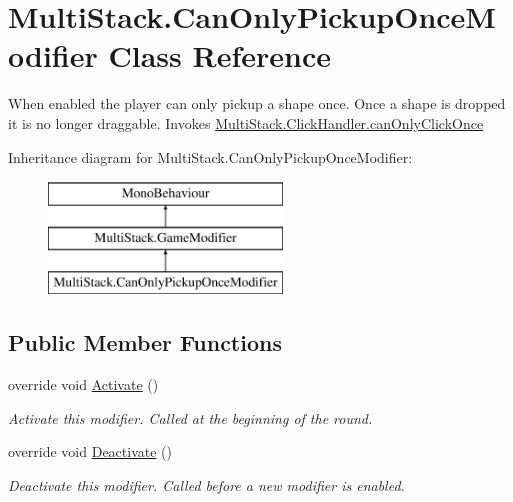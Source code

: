 \hypertarget{class_multi_stack_1_1_can_only_pickup_once_modifier}{}\section{Multi\+Stack.\+Can\+Only\+Pickup\+Once\+Modifier Class Reference}
\label{class_multi_stack_1_1_can_only_pickup_once_modifier}


When enabled the player can only pickup a shape once. Once a shape is dropped it is no longer draggable. Invokes \hyperlink{class_multi_stack_1_1_click_handler_ab7cdf9c5b65265b0f17437ee6313fbeb}{Multi\+Stack.\+Click\+Handler.\+can\+Only\+Click\+Once}  


Inheritance diagram for Multi\+Stack.\+Can\+Only\+Pickup\+Once\+Modifier\+:\begin{figure}[H]
\begin{center}
\leavevmode
\includegraphics[height=3.000000cm]{class_multi_stack_1_1_can_only_pickup_once_modifier}
\end{center}
\end{figure}
\subsection*{Public Member Functions}
\begin{DoxyCompactItemize}
\item 
override void \hyperlink{class_multi_stack_1_1_can_only_pickup_once_modifier_a92da95d7bb53c6c81c60a0a0d28b5c1b}{Activate} ()
\begin{DoxyCompactList}\small\item\em Activate this modifier. Called at the beginning of the round. \end{DoxyCompactList}\item 
override void \hyperlink{class_multi_stack_1_1_can_only_pickup_once_modifier_a5375d39256e231f65b9dddc86581b185}{Deactivate} ()
\begin{DoxyCompactList}\small\item\em Deactivate this modifier. Called before a new modifier is enabled. \end{DoxyCompactList}\end{DoxyCompactItemize}
